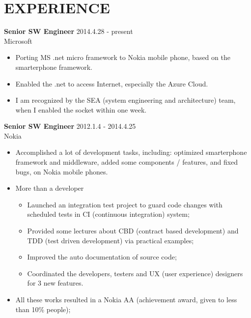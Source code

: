 
\section{EXPERIENCE}
\textbf{Senior SW Engineer} \hfill 2014.4.28 - present\\
        Microsoft
        \begin{itemize}  \itemsep -2pt %
                \item Porting MS .net micro framework to Nokia mobile phone, based on the smarterphone framework.
                \item Enabled the .net to access Internet, especially the Azure Cloud.
                \item I am recognized by the SEA (system engineering and architecture) team, when I enabled the socket within one week.
        \end{itemize}

\textbf{Senior SW Engineer} \hfill 2012.1.4 - 2014.4.25\\
        Nokia
        \begin{itemize}  \itemsep -2pt %
        \item Accomplished a lot of development tasks, including:
            optimized smarterphone framework and middleware, added some components / features, and fixed bugs,
        on Nokia mobile phones.
        \item More than a developer 
            \begin{itemize}  \itemsep -2pt
                \item Launched an integration test project to guard code changes
                with scheduled tests in CI (continuous integration) system;
                \item Provided some lectures about CBD (contract based development) and
                TDD (test driven development) via practical examples;
                \item Improved the auto documentation of source code;
                \item Coordinated the developers, testers and UX (user experience) designers for 3 new features.
            \end{itemize}
        \item All these works resulted in a Nokia AA (achievement award, given to less than 10\% people);
        \end{itemize}

